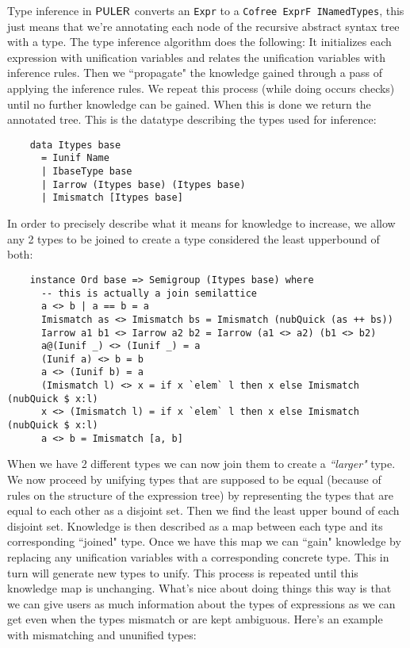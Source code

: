 Type inference in $\mathsf{PULER}$ converts an \texttt{Expr} to a \texttt{Cofree ExprF INamedTypes}, this just means that we're annotating each node of the recursive abstract syntax tree with a type. The type inference algorithm does the following: It initializes each expression with unification variables and relates the unification variables with inference rules. Then we ``propagate" \cite{propagators} the knowledge gained through a pass of applying the inference rules. We repeat this process (while doing occurs checks) until no further knowledge can be gained. When this is done we return the annotated tree. This is the datatype describing the types used for inference:
\begin{verbatim}
    data Itypes base
      = Iunif Name
      | IbaseType base
      | Iarrow (Itypes base) (Itypes base)
      | Imismatch [Itypes base]
\end{verbatim}
In order to precisely describe what it means for knowledge to increase, we allow any 2 types to be joined to create a type considered the least upperbound of both:
\begin{verbatim}
    instance Ord base => Semigroup (Itypes base) where
      -- this is actually a join semilattice
      a <> b | a == b = a
      Imismatch as <> Imismatch bs = Imismatch (nubQuick (as ++ bs))
      Iarrow a1 b1 <> Iarrow a2 b2 = Iarrow (a1 <> a2) (b1 <> b2)
      a@(Iunif _) <> (Iunif _) = a
      (Iunif a) <> b = b
      a <> (Iunif b) = a
      (Imismatch l) <> x = if x `elem` l then x else Imismatch (nubQuick $ x:l)
      x <> (Imismatch l) = if x `elem` l then x else Imismatch (nubQuick $ x:l)
      a <> b = Imismatch [a, b]
\end{verbatim}
When we have 2 different types we can now join them to create a \textit{``larger"} type. We now proceed by unifying types that are supposed to be equal (because of rules on the structure of the expression tree) by representing the types that are equal to each other as a disjoint set. Then we find the least upper bound of each disjoint set. Knowledge is then described as a map between each type and its corresponding ``joined" type. Once we have this map we can ``gain" knowledge by replacing any unification variables with a corresponding concrete type. This in turn will generate new types to unify. This process is repeated until this knowledge map is unchanging. What's nice about doing things this way is that we can give users as much information about the types of expressions as we can get even when the types mismatch or are kept ambiguous. Here's an example with mismatching and ununified types:
